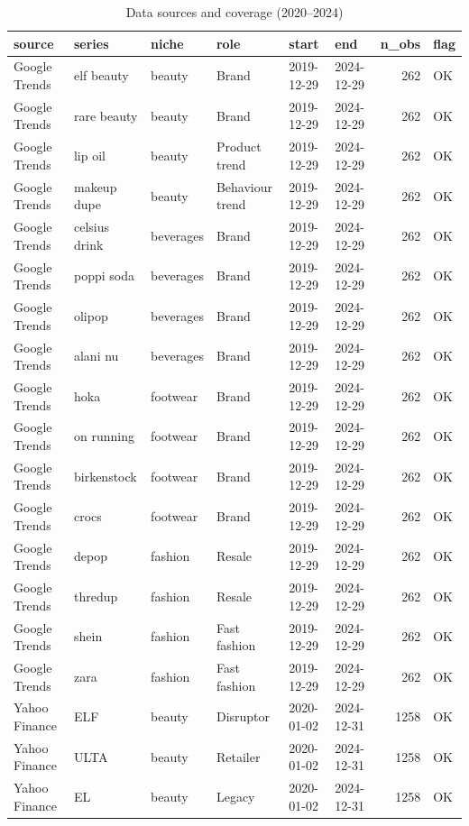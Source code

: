 \begin{table}[t]
\scriptsize
\centering
\caption{Data sources and coverage (2020--2024)}
\label{tab:data_sources}
\begin{tabular}{llllllrl}
\toprule
source & series & niche & role & start & end & n\_obs & flag \\
\midrule
Google Trends & elf beauty & beauty & Brand & 2019-12-29 & 2024-12-29 & 262 & OK \\
Google Trends & rare beauty & beauty & Brand & 2019-12-29 & 2024-12-29 & 262 & OK \\
Google Trends & lip oil & beauty & Product trend & 2019-12-29 & 2024-12-29 & 262 & OK \\
Google Trends & makeup dupe & beauty & Behaviour trend & 2019-12-29 & 2024-12-29 & 262 & OK \\
Google Trends & celsius drink & beverages & Brand & 2019-12-29 & 2024-12-29 & 262 & OK \\
Google Trends & poppi soda & beverages & Brand & 2019-12-29 & 2024-12-29 & 262 & OK \\
Google Trends & olipop & beverages & Brand & 2019-12-29 & 2024-12-29 & 262 & OK \\
Google Trends & alani nu & beverages & Brand & 2019-12-29 & 2024-12-29 & 262 & OK \\
Google Trends & hoka & footwear & Brand & 2019-12-29 & 2024-12-29 & 262 & OK \\
Google Trends & on running & footwear & Brand & 2019-12-29 & 2024-12-29 & 262 & OK \\
Google Trends & birkenstock & footwear & Brand & 2019-12-29 & 2024-12-29 & 262 & OK \\
Google Trends & crocs & footwear & Brand & 2019-12-29 & 2024-12-29 & 262 & OK \\
Google Trends & depop & fashion & Resale & 2019-12-29 & 2024-12-29 & 262 & OK \\
Google Trends & thredup & fashion & Resale & 2019-12-29 & 2024-12-29 & 262 & OK \\
Google Trends & shein & fashion & Fast fashion & 2019-12-29 & 2024-12-29 & 262 & OK \\
Google Trends & zara & fashion & Fast fashion & 2019-12-29 & 2024-12-29 & 262 & OK \\
Yahoo Finance & ELF & beauty & Disruptor & 2020-01-02 & 2024-12-31 & 1258 & OK \\
Yahoo Finance & ULTA & beauty & Retailer & 2020-01-02 & 2024-12-31 & 1258 & OK \\
Yahoo Finance & EL & beauty & Legacy & 2020-01-02 & 2024-12-31 & 1258 & OK \\

\end{tabular}
\end{table}
